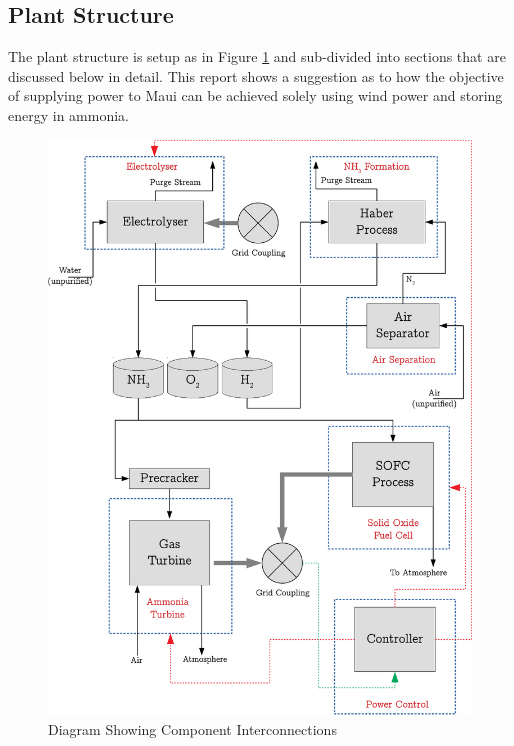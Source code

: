 \subsection{Plant Structure}

The plant structure is setup as in Figure \ref{fig:plantglobaldiagram} and sub-divided into sections that are discussed below in detail.
This report shows a suggestion as to how the objective of supplying power to Maui can be achieved solely using wind power and storing energy in ammonia.

\begin{figure}[hb]
        \centering
        \includegraphics[scale=0.7]{plantdiagram.pdf}
        \caption{Diagram Showing Component Interconnections}
        \label{fig:plantglobaldiagram}
\end{figure}


